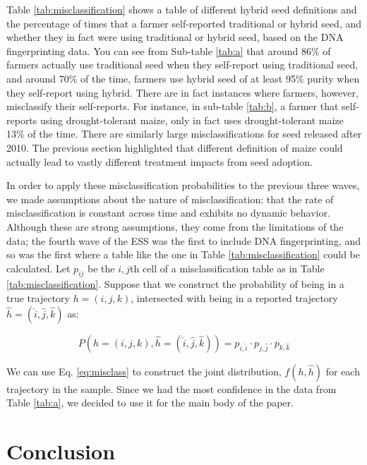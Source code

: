 \documentclass[11pt]{article}
\begin{document}
Table \ref{tab:misclassification} shows a table of different hybrid seed definitions and the percentage of times that a farmer self-reported traditional or hybrid seed, and whether they in fact were using traditional or hybrid seed, based on the DNA fingerprinting data. You can see from Sub-table \ref{tab:a} that around 86\% of farmers actually use traditional seed when they self-report using traditional seed, and around 70\% of the time, farmers use hybrid seed of at least 95\% purity when they self-report using hybrid. There are in fact instances where farmers, however, misclassify their self-reports. For instance, in sub-table \ref{tab:b}, a farmer that self-reports using drought-tolerant maize, only in fact uses drought-tolerant maize 13\% of the time. There are similarly large misclassifications for seed released after 2010. The previous section highlighted that different definition of maize could actually lead to vastly different treatment impacts from seed adoption. 

In order to apply these misclassification probabilities to the previous three waves, we made assumptions about the nature of misclassification: that the rate of misclassification is constant across time and exhibits no dynamic behavior. Although these are strong assumptions, they come from the limitations of the data; the fourth wave of the ESS was the first to include DNA fingerprinting, and so was the first where a table like the one in Table \ref{tab:misclassification} could be calculated. Let $p_{ij}$ be the $i,j$th cell of a misclassification table as in Table \ref{tab:misclassification}. Suppose that we construct the probability of being in a true trajectory $h = (i,j,k)$, intersected with being in a reported trajectory $\hat{h} = (\hat{i},\hat{j}, \hat{k})$ as:

\begin{equation}
\label{eq:misclass}
P(h = (i,j,k) , \hat{h} = (\hat{i},\hat{j}, \hat{k})) = p_{i, \hat{i}}\cdot p_{j, \hat{j}}\cdot p_{k, \hat{k}}
\end{equation}

We can use Eq. \ref{eq:misclass} to construct the joint distribution, $f(h, \hat{h})$ for each trajectory in the sample. Since we had the most confidence in the data from Table \ref{tab:a}, we decided to use it for the main body of the paper. 

\section{Conclusion}\label{sec:conclusion}
\end{document}
